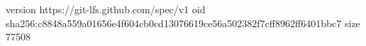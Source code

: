 version https://git-lfs.github.com/spec/v1
oid sha256:c8848a559a01656e4f604cb0cd13076619ce56a502382f7cff8962ff6401bbc7
size 77508
